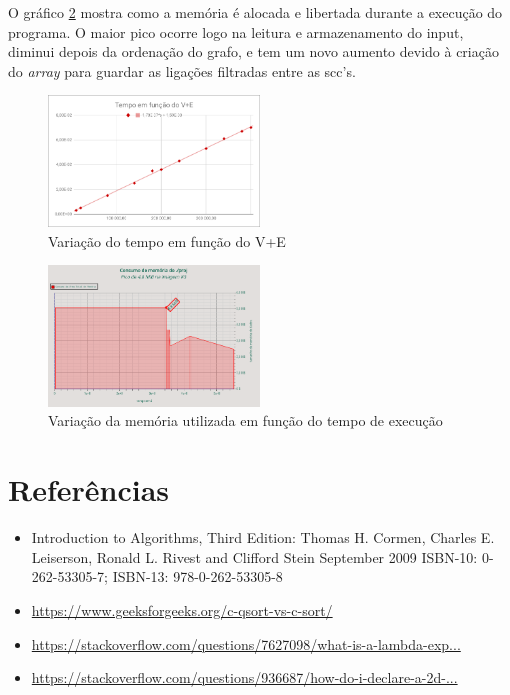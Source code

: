 \documentclass[12pt,a4paper]{article}
\begin{document}
O gráfico \ref{g2} mostra como a memória é alocada e libertada durante a execução do programa. O maior pico ocorre logo na leitura e armazenamento do input, diminui depois da ordenação do grafo, e tem
um novo aumento devido à criação do \textit{array} para guardar as ligações filtradas entre as scc's.
\begin{figure}[h]
			\centering
			\includegraphics[width=0.5\textwidth]{ss_t(V+E)}
			\caption{Variação do tempo em função do V+E}
			\label{g1}
\end{figure}
\begin{figure}[h]
			\centering
			\includegraphics[width=0.5\textwidth]{ss_m(tex)}
			\caption{Variação da memória utilizada em função do tempo de execução}
			\label{g2}
\end{figure}

\section{Referências}
\begin{itemize}
	\item Introduction to Algorithms, Third Edition: Thomas H. Cormen, Charles E. Leiserson, Ronald L. Rivest and Clifford Stein September 2009 ISBN-10: 0-262-53305-7; ISBN-13: 978-0-262-53305-8
	\item \href{https://www.geeksforgeeks.org/c-qsort-vs-c-sort/}{https://www.geeksforgeeks.org/c-qsort-vs-c-sort/}
	\item \href{https://stackoverflow.com/questions/7627098/what-is-a-lambda-expression-in-c11/7627330#7627330}{https://stackoverflow.com/questions/7627098/what-is-a-lambda-exp...}
	\item \href{https://stackoverflow.com/questions/936687/how-do-i-declare-a-2d-array-in-c-using-new/28841507#28841507}{https://stackoverflow.com/questions/936687/how-do-i-declare-a-2d-...}
\end{itemize}
\end{document}
